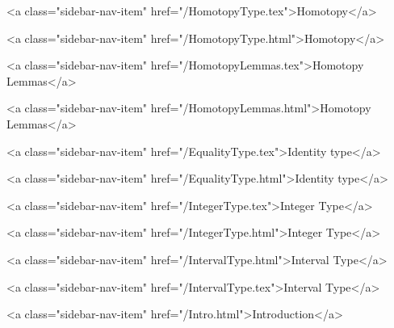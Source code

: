       
    
      
        
          <a class="sidebar-nav-item" href="/HomotopyType.tex">Homotopy</a>
        
      
    
      
        
          <a class="sidebar-nav-item" href="/HomotopyType.html">Homotopy</a>
        
      
    
      
        
          <a class="sidebar-nav-item" href="/HomotopyLemmas.tex">Homotopy Lemmas</a>
        
      
    
      
        
          <a class="sidebar-nav-item" href="/HomotopyLemmas.html">Homotopy Lemmas</a>
        
      
    
      
        
          <a class="sidebar-nav-item" href="/EqualityType.tex">Identity type</a>
        
      
    
      
        
          <a class="sidebar-nav-item" href="/EqualityType.html">Identity type</a>
        
      
    
      
        
          <a class="sidebar-nav-item" href="/IntegerType.tex">Integer Type</a>
        
      
    
      
        
          <a class="sidebar-nav-item" href="/IntegerType.html">Integer Type</a>
        
      
    
      
        
          <a class="sidebar-nav-item" href="/IntervalType.html">Interval Type</a>
        
      
    
      
        
          <a class="sidebar-nav-item" href="/IntervalType.tex">Interval Type</a>
        
      
    
      
        
          <a class="sidebar-nav-item" href="/Intro.html">Introduction</a>
        
